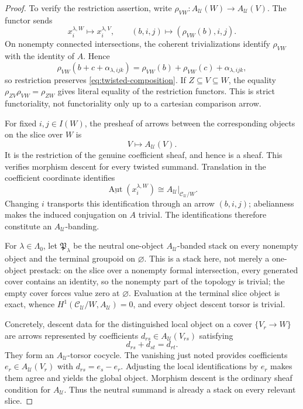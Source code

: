 \begin{proof}
To verify the restriction assertion, write
\(\rho_{VW}:A_{\mathcal U}(W)\to A_{\mathcal U}(V)\).  The functor sends
\[
 x_i^{\lambda,W}\longmapsto x_i^{\lambda,V},
 \qquad
 (b,i,j)\longmapsto(\rho_{VW}(b),i,j).
\]
On nonempty connected intersections, the coherent trivializations identify
\(\rho_{VW}\) with the identity of \(A\).  Hence
\[
 \rho_{VW}(b+c+\alpha_{\lambda,ijk})
 =\rho_{VW}(b)+\rho_{VW}(c)+\alpha_{\lambda,ijk},
\]
so restriction preserves \eqref{eq:twisted-composition}.  If
\(Z\subseteq V\subseteq W\), the equality
\(\rho_{ZV}\rho_{VW}=\rho_{ZW}\) gives literal equality of the restriction
functors.  This is strict functoriality, not functoriality only up to a
cartesian comparison arrow.

For fixed \(i,j\in I(W)\), the presheaf of arrows between the corresponding
objects on the slice over \(W\) is
\[
 V\longmapsto A_{\mathcal U}(V).
\]
It is the restriction of the genuine coefficient sheaf, and hence is a
sheaf.  This verifies morphism descent for every twisted summand.
Translation in the coefficient coordinate identifies
\[
 \underline{\operatorname{Aut}}(x_i^{\lambda,W})
 \cong A_{\mathcal U}|_{\mathcal C_{\mathcal U}/W}.
\]
Changing \(i\) transports this identification through an arrow
\((b,i,j)\); abelianness makes the induced conjugation on \(A\) trivial.
The identifications therefore constitute an \(A_{\mathcal U}\)-banding.

For \(\lambda\in\Lambda_0\), let \(\mathfrak P_\lambda\) be the neutral
one-object \(A_{\mathcal U}\)-banded stack on every nonempty object and the
terminal groupoid on \(\varnothing\).  This is a stack here, not merely a
one-object prestack: on the slice over a nonempty formal intersection, every
generated cover contains an identity, so the nonempty part of the topology
is trivial; the empty cover forces value zero at \(\varnothing\).  Evaluation
at the terminal slice object is exact, whence
\(H^1(\mathcal C_{\mathcal U}/W,A_{\mathcal U})=0\), and every object
descent torsor is trivial.

Concretely, descent data for the distinguished local object on a cover
\(\{V_r\to W\}\) are arrows represented by coefficients
\(d_{rs}\in A_{\mathcal U}(V_{rs})\) satisfying
\[
 d_{rs}+d_{st}=d_{rt}.
\]
They form an \(A_{\mathcal U}\)-torsor cocycle.  The vanishing just noted
provides coefficients \(e_r\in A_{\mathcal U}(V_r)\) with
\(d_{rs}=e_s-e_r\).  Adjusting the local identifications by \(e_r\) makes
them agree and yields the global object.  Morphism descent is the ordinary
sheaf condition for \(A_{\mathcal U}\).  Thus the neutral summand is already
a stack on every relevant slice.


\end{proof}

